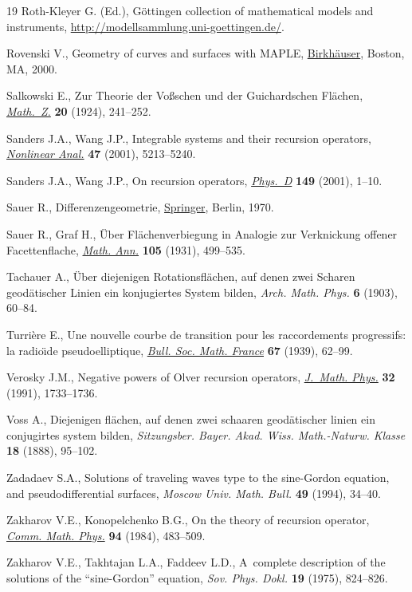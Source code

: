 \documentclass[pdftex]{sigma}
\numberwithin{equation}{section}
\theoremstyle{definition}
\begin{document}
\begin{thebibliography}{19}
Roth-Kleyer G. (Ed.), G\"ottingen collection of mathematical models and instruments,
 \url{http://modellsammlung.uni-goettingen.de/}.

Rovenski V., Geometry of curves and surfaces with {MAPLE},
 \href{https://doi.org/10.1007/978-1-4612-2128-9}{Birkh\"auser}, Boston, MA,
 2000.

Salkowski E., Zur {T}heorie der {V}o\ss schen und der {G}uichardschen
 {F}l\"achen, \href{https://doi.org/10.1007/BF01188086}{\textit{Math.~Z.}}
 \textbf{20} (1924), 241--252.

Sanders J.A., Wang J.P., Integrable systems and their recursion operators,
 \href{https://doi.org/10.1016/S0362-546X(01)00630-7}{\textit{Nonlinear
 Anal.}} \textbf{47} (2001), 5213--5240.

Sanders J.A., Wang J.P., On recursion operators,
 \href{https://doi.org/10.1016/S0167-2789(00)00188-3}{\textit{Phys.~D}}
 \textbf{149} (2001), 1--10.

Sauer R., Differenzengeometrie,
 \href{https://doi.org/10.1007/978-3-642-86411-7}{Springer}, Berlin, 1970.

Sauer R., Graf H., \"{U}ber {F}l\"achenverbiegung in {A}nalogie zur
 {V}erknickung offener {F}acettenflache,
 \href{https://doi.org/10.1007/BF01455828}{\textit{Math. Ann.}} \textbf{105}
 (1931), 499--535.

Tachauer A., \"Uber diejenigen {R}otationsfl\"achen, auf denen zwei {S}charen
 geod\"atischer {L}inien ein konjugiertes {S}ystem bilden, \textit{Arch. Math.
 Phys.} \textbf{6} (1903), 60--84.

Turri\`ere E., Une nouvelle courbe de transition pour les raccordements
 progressifs: la radio\"{\i}de pseudoelliptique,
 \href{https://doi.org/10.24033/bsmf.1291}{\textit{Bull. Soc. Math. France}}
 \textbf{67} (1939), 62--99.

Verosky J.M., Negative powers of {O}lver recursion operators,
 \href{https://doi.org/10.1063/1.529234}{\textit{J.~Math. Phys.}} \textbf{32}
 (1991), 1733--1736.

Voss A., Diejenigen fl\"achen, auf denen zwei schaaren geod\"atischer linien
 ein conjugirtes system bilden, \textit{Sitzungsber. Bayer. Akad. Wiss.
 Math.-Naturw. Klasse} \textbf{18} (1888), 95--102.

Zadadaev S.A., Solutions of traveling waves type to the sine-{G}ordon equation,
 and pseudodifferential surfaces, \textit{Moscow Univ. Math. Bull.}
 \textbf{49} (1994), 34--40.

Zakharov V.E., Konopelchenko B.G., On the theory of recursion operator,
 \href{https://doi.org/10.1007/BF01403883}{\textit{Comm. Math. Phys.}}
 \textbf{94} (1984), 483--509.

Zakharov V.E., Takhtajan L.A., Faddeev L.D., A~complete description of the
 solutions of the ``sine-{G}ordon'' equation, \textit{Sov. Phys. Dokl.}
 \textbf{19} (1975), 824--826.

\end{thebibliography}\LastPageEnding
\end{document}
